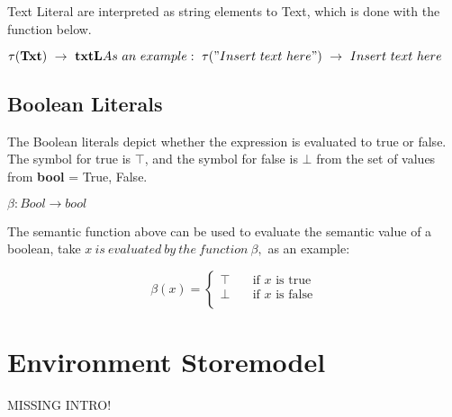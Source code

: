   
  Text Literal are interpreted as string elements to Text, which is done with the function below. 
  
  \begin{math}
  	\tau(\textbf{Txt}) \ \rightarrow \ \textbf{txtL} \newline
  	As \ an \ example: \ \tau("Insert \ text \ here") \ \rightarrow \ Insert \ text \ here
  \end{math}
  
  \subsection{Boolean Literals}
  The Boolean literals depict whether the expression is evaluated to true or false. The symbol for true is \begin{math} \top \end{math}, and the symbol for false is \begin{math} \bot \end{math} from the set of values from \textbf{bool} = {True, False}.
  
  \begin{math}
  	\beta : Bool \rightarrow bool
  \end{math}
  
  The semantic function above can be used to evaluate the semantic value of a boolean, take \begin{math} x \ is \ evaluated \ by \ the \ function \ \beta,  \end{math} as an example:
  
  \[ \beta(x) =
    \begin{cases}
      \top       & \quad \text{if } x \text{ is true}\\
      \bot  & \quad \text{if } x \text{ is false}\\
    \end{cases}
  \]
  
  
  \section{Environment Storemodel}
  MISSING INTRO!
  
  
  
